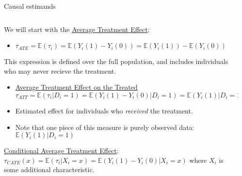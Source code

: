 \documentclass[notes,11pt, aspectratio=169]{beamer}
\newenvironment{wideitemize}{\itemize\addtolength{\itemsep}{10pt}}{\enditemize}
\begin{document}
\begin{frame}{Causal estimands}
\begin{columns}[T] %
\begin{column}{.85\textwidth}
  \begin{wideitemize}
  \item We will start with the \underline{Average Treatment Effect}:
    \begin{itemize}
    \item $\tau_{ATE} = \mathbb{E}(\tau_{i}) = \mathbb{E}(Y_{i}(1) - Y_{i}(0)) = \mathbb{E}(Y_{i}(1)) - \mathbb{E}(Y_{i}(0))$
    \end{itemize}
  \item This expression is defined over the full population, and
    includes individuals who may never recieve the treatment.
    \begin{itemize}
    \item \underline{Average Treatment Effect on the Treated} $\tau_{ATT} = \mathbb{E}(\tau_{i} | D_{i} = 1) = \mathbb{E}(Y_{i}(1) - Y_{i}(0) | D_{i} = 1) = \mathbb{E}(Y_{i}(1) | D_{i} = 1) - \mathbb{E}(Y_{i}(0) | D_{i} = 1)$
    \item Estimated effect for individuals who \emph{received} the treatment.
    \item Note that one piece of this measure is purely observed data: $\mathbb{E}(Y_{i}(1) | D_{i} = 1)$
    \end{itemize}
  \item \underline{Conditional Average Treatment Effect}:  $\tau_{CATE}(x) = \mathbb{E}(\tau_{i} | X_{i} = x) = \mathbb{E}(Y_{i}(1) - Y_{i}(0) |  X_{i} = x)$ where $X_{i}$ is some additional characteristic. 
  \end{wideitemize}
\end{column}%
\hfill%
\begin{column}{.38\textwidth}
\end{column}%
\end{columns}
\end{frame}
\end{document}
